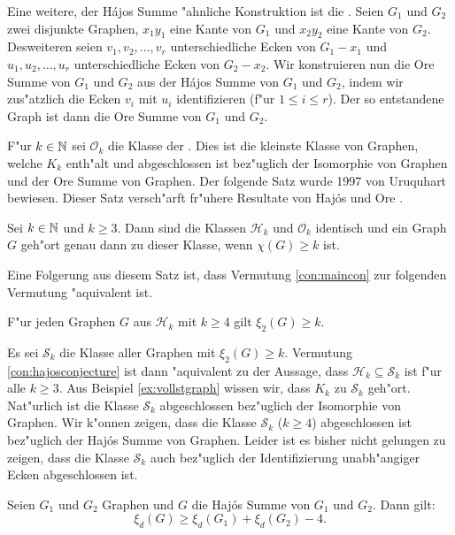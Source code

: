 Eine weitere, der H\'ajos Summe "ahnliche Konstruktion ist die . Seien $G_1$ und $G_2$ zwei disjunkte Graphen, $x_1y_1$ eine Kante von $G_1$ und $x_2y_2$ eine Kante von $G_2$. Desweiteren seien $v_1,v_2,\dots,v_r$ unterschiedliche Ecken von $G_1- x_1$ und $u_1,u_2,\dots,u_r$ unterschiedliche Ecken von $G_2- x_2$. 
Wir konstruieren nun die Ore Summe von $G_1$ und $G_2$ aus der H\'ajos Summe von $G_1$ und $G_2$, indem wir zus"atzlich die Ecken $v_i$ mit $u_i$ identifizieren (f"ur $1\leq i \leq r$). Der so entstandene Graph ist dann die Ore Summe von $G_1$ und $G_2$. 

F"ur $k\in {\mathbb{N}}$ sei $\mathcal{O}_k$ die Klasse der . Dies ist die kleinste Klasse von Graphen, welche $K_k$ enth"alt und abgeschlossen ist bez"uglich der Isomorphie von Graphen und der Ore Summe von Graphen.
Der folgende Satz wurde 1997 von Uruquhart  \cite{Urquhart97} bewiesen. Dieser Satz versch"arft fr"uhere Resultate von Haj\'os \cite{Hajos61} und Ore \cite{Ore67}. 
\begin{theorem}[Uruquhart]
  Sei $k\in {\mathbb{N}}$ und $k \geq 3$. Dann sind die Klassen $\mathcal{H}_k$ und $\mathcal{O}_k$ identisch und ein Graph $G$ geh"ort genau dann zu dieser Klasse, wenn $\chi(G) \geq k$ ist.
  \label{thm:uruquhart}
\end{theorem}

Eine Folgerung aus diesem Satz ist, dass Vermutung \ref{con:maincon} zur folgenden Vermutung "aquivalent ist.
\begin{conjecture}
  F"ur jeden Graphen $G$ aus $\mathcal{H}_k$ mit $k\geq 4$ gilt $\xi_{2}(G) \geq k$. 
  \label{con:hajosconjecture}
\end{conjecture}

Es sei $\mathcal{S}_k$ die Klasse aller Graphen mit $\xi_{2}(G) \geq k$. Vermutung \ref{con:hajosconjecture} ist dann "aquivalent zu der Aussage, dass $\mathcal{H}_k \subseteq \mathcal{S}_k$ ist f"ur alle $k\geq 3$. 
Aus Beispiel \ref{ex:vollstgraph} wissen wir, dass $K_k$ zu $\mathcal{S}_k$ geh"ort. Nat"urlich ist die Klasse $\mathcal{S}_k$ abgeschlossen bez"uglich der Isomorphie von Graphen. Wir k"onnen zeigen, dass die Klasse $\mathcal{S}_k$ ($k\geq 4$) abgeschlossen ist bez"uglich der Haj\'os Summe von Graphen. Leider ist es bisher nicht gelungen zu zeigen, dass die Klasse $\mathcal{S}_k$ auch bez"uglich der Identifizierung unabh"angiger Ecken abgeschlossen ist.
\begin{theorem}
  Seien $G_1$ und $G_2$ Graphen und $G$ die Haj\'os Summe von $G_1$ und $G_2$. Dann gilt:
  $$\xi_{d}(G) \geq \xi_{d}(G_1) + \xi_{d}(G_2)-4.$$
  \label{thm:hajoseigenwerte}
\end{theorem}

